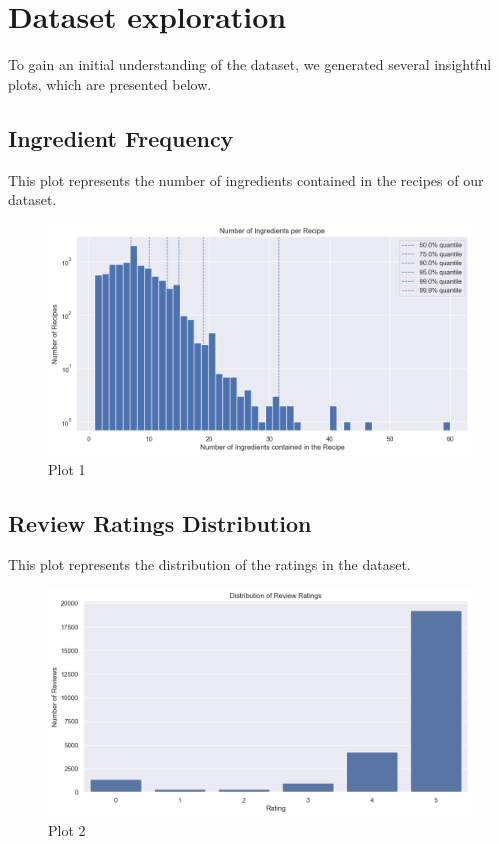 \section{Dataset exploration}
To gain an initial understanding of the dataset, we generated several insightful plots, which are presented below.
\subsection{Ingredient Frequency}
This plot represents the number of ingredients contained in the recipes of our dataset.
\begin{figure}[H]
    \centering
    \includegraphics[width=\linewidth]{Report/ReportLatex/Images/Analisysplots/plot1.png}
    \caption{Plot 1}
    \label{fig:enter-label}
    \end{figure}
\subsection{Review Ratings Distribution}
This plot represents the distribution of the ratings in the dataset.
\begin{figure}[H]
    \centering
    \includegraphics[width=\linewidth]{Report/ReportLatex/Images/Analisysplots/plot2.png}
    \caption{Plot 2}
    \label{fig:enter-label}
    \end{figure}
